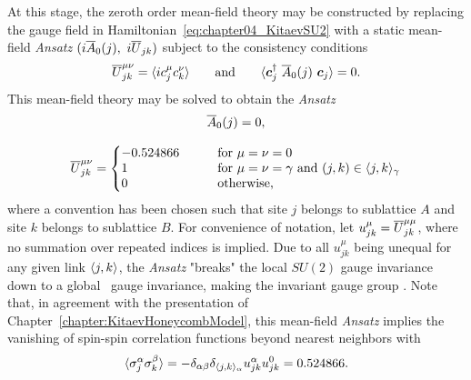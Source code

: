 At this stage, the zeroth order mean-field theory may be constructed by replacing the gauge field in Hamiltonian~\eqref{eq:chapter04_KitaevSU2} with a static mean-field \textit{Ansatz} $(i\overline{A}_0(j),~i\overline{U}_{jk})$ subject to the consistency conditions
%
\begin{equation}
	\overline{U}^{\mu\nu}_{jk} = \langle i c^{\mu}_j c^{\nu}_k \rangle \qquad {\rm and } \qquad \langle \bm{c}^{\dagger}_j ~ \overline{A}_0(j) ~ \bm{c}_j \rangle = 0.
\end{equation}
%
This mean-field theory may be solved to obtain the \textit{Ansatz}~\cite{YouPRB2012,SeifertPRBFeb2018}
%
\begin{equation}
	\begin{matrix*}[c]
		\ansatz{A}_0(j) 			= 0, \\
		\\
		\ansatz{U}^{\mu\nu}_{jk}	= \left\{
			\begin{matrix*}[l]
				-0.524866 &
				\qquad \text{for $\mu = \nu = 0$}\\
				1 &
				\qquad \text{for $\mu = \nu = \gamma$ and $(j,k) \in \avg{j,k}_{\gamma}$}\\
				0 &
				\qquad \text{otherwise,}
			\end{matrix*}
			\right.
	\end{matrix*}
\end{equation}
%
where a convention has been chosen such that site $j$ belongs to sublattice $A$ and site $k$ belongs to sublattice $B$.
For convenience of notation, let $u^{\mu}_{jk} = \overline{U}^{\mu\mu}_{jk}$, where no summation over repeated indices is implied.
Due to all $u^{\mu}_{jk}$ being unequal for any given link $\langle j,k \rangle$, the \textit{Ansatz} "breaks" the local $SU(2)$ gauge invariance down to a global \ZZ~gauge invariance, making the invariant gauge group \ZZ.
Note that, in agreement with the presentation of Chapter~\ref{chapter:KitaevHoneycombModel}, this mean-field \textit{Ansatz} implies the vanishing of spin-spin correlation functions beyond nearest neighbors with
%
\begin{equation}
	\langle \sigma^{\alpha}_j \sigma^{\beta}_k \rangle = - \delta_{\alpha\beta} \delta_{\langle j,k \rangle_\alpha} u^{\alpha}_{jk} u^0_{jk} = 0.524866.
\end{equation}
%

